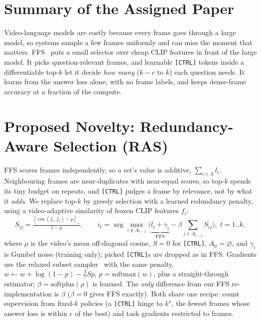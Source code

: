 

\section{Summary of the Assigned Paper}
Video-language models are costly because every frame goes through a large model, so systems sample a few frames
uniformly and can miss the moment that matters. FFS~\cite{buch2025ffs} puts a small selector over cheap CLIP features in
front of the large model. It picks question-relevant frames, and learnable \texttt{[CTRL]} tokens inside a
differentiable top-$k$ let it decide \emph{how many} ($k{-}c$ to $k$) each question needs. It learns from the answer loss
alone, with no frame labels, and keeps dense-frame accuracy at a fraction of the compute.

\section{Proposed Novelty: Redundancy-Aware Selection (RAS)}
FFS scores frames independently, so a set's value is additive, $\sum_{i\in A} l_i$. Neighbouring frames are
near-duplicates with near-equal scores, so top-$k$ spends its tiny budget on repeats, and \texttt{[CTRL]} judges a frame
by relevance, not by what it \emph{adds}. We replace top-$k$ by greedy selection with a learned redundancy penalty, using
a video-adaptive similarity of frozen CLIP features $f_i$:
\begin{equation}
S_{ij}=\tfrac{[\cos(f_i,f_j)-\mu]_+}{1-\mu},\qquad
i_t=\arg\max_{i\notin A_{t-1}}\big(\underbrace{l_i+\gamma_i}_{\text{FFS}}-\beta\textstyle\sum_{j\in A_{t-1}}S_{ij}\big),\;t=1..k,
\end{equation}
where $\mu$ is the video's mean off-diagonal cosine, $S{=}0$ for \texttt{[CTRL]}, $A_0=\varnothing$,
and $\gamma_i$ is Gumbel noise (training only); picked \texttt{[CTRL]}s are dropped as in FFS. Gradients use the relaxed subset
sampler~\cite{xie2019subset} with the same penalty, $w\leftarrow w+\log(1-p)-\tfrac{\beta}{\tau}Sp$, $p=\mathrm{softmax}(w)$,
plus a straight-through estimator; $\beta=\mathrm{softplus}(\rho)$ is learned. The \emph{only} difference from our FFS
re-implementation is $\beta$ ($\beta=0$ gives FFS exactly). Both share one recipe: count supervision from fixed-$k$ policies
(a \texttt{[CTRL]} hinge to $k^\star$, the fewest frames whose answer loss is within $\epsilon$ of the best) and task gradients restricted to frames.

